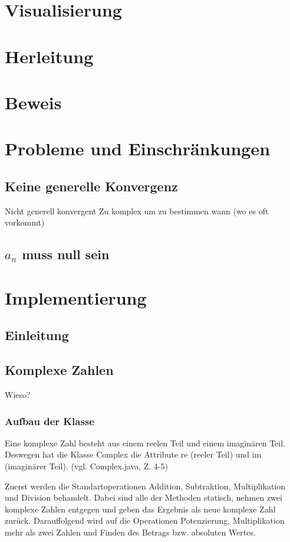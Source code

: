 \documentclass[12pt]{article}
\begin{document}
\section{Visualisierung}

\section{Herleitung}

\section{Beweis}

\section{Probleme und Einschränkungen}
\subsection{Keine generelle Konvergenz}
Nicht generell konvergent
Zu komplex um zu bestimmen wann (wo es oft vorkommt)

\subsection{$a_n$ muss null sein}

\section{Implementierung}
\subsection{Einleitung}
\subsection{Komplexe Zahlen}
Wieso?

\subsubsection{Aufbau der Klasse}
Eine komplexe Zahl besteht aus einem reelen Teil und einem imaginären Teil. Deswegen hat die Klasse Complex die Attribute re (reeler Teil) und im (imaginärer Teil). 
(vgl. Complex.java, Z. 4-5)

Zuerst werden die Standartoperationen Addition, Subtraktion, Multiplikation und Division behandelt. Dabei sind alle der Methoden statisch, nehmen zwei komplexe Zahlen entgegen und geben das Ergebnis als neue komplexe Zahl zurück. Darauffolgend wird auf die Operationen Potenzierung, Multiplikation mehr als zwei Zahlen und Finden des Betrags bzw. absoluten Wertes. 
\end{document}
